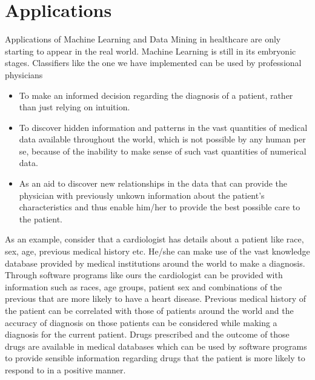\documentclass[11pt,a4paper]{report}
\begin{document}
{%



\chapter{Applications}

Applications of Machine Learning and Data Mining in healthcare are only starting to appear in the real world. Machine Learning is still in its embryonic stages. Classifiers like the one we have implemented can be used by professional physicians\\

\begin{itemize}             
\item To make an informed decision regarding the diagnosis of a patient, rather than just relying on intuition.\\
\item To discover hidden information and patterns in the vast quantities of medical data available throughout the world, which is not possible by any human per se, because of the inability to make sense of such vast quantities of numerical data.
\item As an aid to discover new relationships in the data that can provide the physician with previously unkown information about the patient's characteristics and thus enable him/her to provide the best possible care to the patient.\\ 
\end{itemize}

As an example, consider that a cardiologist has details about a patient like race, sex, age, previous medical history etc. He/she can make use of the vast knowledge database provided by medical institutions around the world to make a diagnosis. Through software programs like ours the cardiologist can be provided with information such as races, age groups, patient sex and combinations of the previous that are more likely to have a heart disease. Previous medical history of the patient can be correlated with those of patients around the world and the accuracy of diagnosis on those patients can be considered while making a diagnosis for the current patient. Drugs prescribed and the outcome of those drugs are available in medical databases which can be used by software programs to provide sensible information regarding drugs that the patient is more likely to respond to in a positive manner. \\

}
\end{document}
